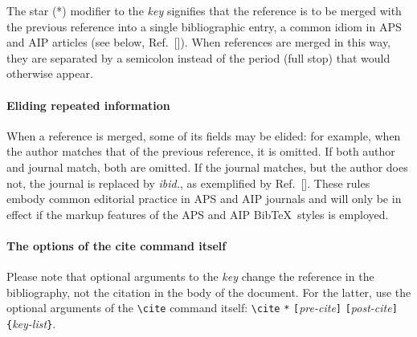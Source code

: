 \documentclass[%
 reprint,
 amsmath,amssymb,
 aps,
]{revtex4-1}
\begin{document}
The star (*) modifier to the \emph{key} signifies that the reference is to be 
merged with the previous reference into a single bibliographic entry, 
a common idiom in APS and AIP articles (see below, Ref.~[]). 
When references are merged in this way, they are separated by a semicolon instead of 
the period (full stop) that would otherwise appear.

\paragraph{Eliding repeated information}
When a reference is merged, some of its fields may be elided: for example, 
when the author matches that of the previous reference, it is omitted. 
If both author and journal match, both are omitted.
If the journal matches, but the author does not, the journal is replaced by \emph{ibid.},
as exemplified by Ref.~[]. 
These rules embody common editorial practice in APS and AIP journals and will only
be in effect if the markup features of the APS and AIP Bib\TeX\ styles is employed.

\paragraph{The options of the cite command itself}
Please note that optional arguments to the \emph{key} change the reference in the bibliography, 
not the citation in the body of the document. 
For the latter, use the optional arguments of the \verb+\cite+ command itself:
\verb+\cite+ \texttt{*}\allowbreak
\texttt{[}\emph{pre-cite}\texttt{]}\allowbreak
\texttt{[}\emph{post-cite}\texttt{]}\allowbreak
\verb+{+\emph{key-list}\verb+}+.
\end{document}
